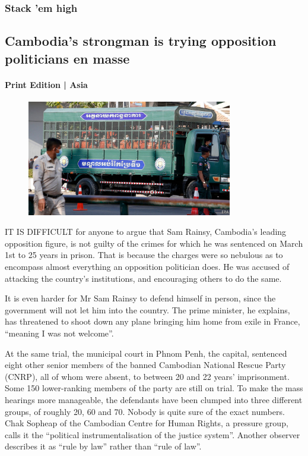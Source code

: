 \documentclass{article}
\begin{document}
\subsubsection{Stack 'em high }
\subsection{Cambodia's strongman is trying opposition politicians en masse }
\paragraph{Print Edition | Asia  \quad \color{gray}{Mar 25th 2021 }}
\begin{figure}[h]
\centering
\includegraphics[width=0.8\textwidth]{images/20210327_asp501.jpg}
\end{figure}
\lettrine{I}T IS DIFFICULT for anyone to argue that Sam Rainsy, Cambodia's leading opposition figure, is not guilty of the crimes for which he was sentenced on March 1st to 25 years in prison. That is because the charges were so nebulous as to encompass almost everything an opposition politician does. He was accused of attacking the country's institutions, and encouraging others to do the same. 

It is even harder for Mr Sam Rainsy to defend himself in person, since the government will not let him into the country. The prime minister, he explains, has threatened to shoot down any plane bringing him home from exile in France, ``meaning I was not welcome''. 

At the same trial, the municipal court in Phnom Penh, the capital, sentenced eight other senior members of the banned Cambodian National Rescue Party (CNRP), all of whom were absent, to between 20 and 22 years' imprisonment. Some 150 lower-ranking members of the party are still on trial. To make the mass hearings more manageable, the defendants have been clumped into three different groups, of roughly 20, 60 and 70. Nobody is quite sure of the exact numbers. Chak Sopheap of the Cambodian Centre for Human Rights, a pressure group, calls it the ``political instrumentalisation of the justice system''. Another observer describes it as ``rule by law'' rather than ``rule of law''. 
\end{document}
